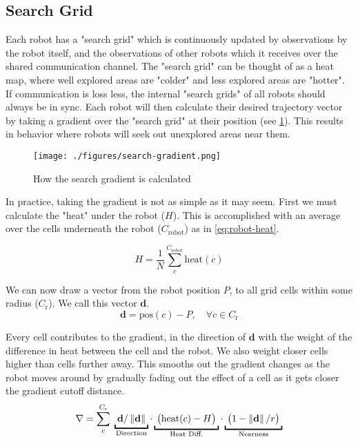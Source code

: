 
\subsection{Search Grid}

Each robot has a "search grid" which is continuously updated by observations by the robot itself, and the observations of other robots which it receives over the shared communication channel. The "search grid" can be thought of as a heat map, where well explored areas are "colder" and less explored areas are "hotter". If communication is loss less, the internal "search grids" of all robots should always be in sync. Each robot will then calculate their desired trajectory vector by taking a gradient over the "search grid" at their position (see \cref{fig:search-gradient}). This results in behavior where robots will seek out unexplored areas near them.

\begin{figure}[h]
    \begin{center}
        \texttt{[image: ./figures/search-gradient.png]}
    \end{center}
    \caption{How the search gradient is calculated}
    \label{fig:search-gradient}
\end{figure}


In practice, taking the gradient is not as simple as it may seem. First we must calculate the "heat" under the robot ($H$). This is accomplished with an average over the cells underneath the robot ($C_\mathrm{robot}$) as in \cref{eq:robot-heat}.

\begin{equation}
\label{eq:robot-heat}
    H = \frac{1}{N} \sum_c^{C_\mathrm{robot}} \mathrm{heat}(c)
\end{equation}

We can now draw a vector from the robot position $P$, to all grid cells within some radius ($C_\mathrm{r}$). We call this vector $\mathbf{d}$.
\begin{equation}
    \mathbf{d} = \mathrm{pos}(c) - P, \quad \forall c \in C_\mathrm{r}
\end{equation}

Every cell contributes to the gradient, in the direction of $\mathbf{d}$ with the weight of the difference in heat between the cell and the robot. We also weight closer cells higher than cells further away. This smooths out the gradient changes as the robot moves around by gradually fading out the effect of a cell as it gets closer the gradient cutoff distance.
\begin{equation}
    \nabla = \sum_c^{C_\mathrm{r}} \;
    \underbracket{\; \mathbf{d}/\norm{\mathbf{d}}      \;}_\text{\makebox[0pt]{Direction}} \cdot
    \underbracket{\; \big(\mathrm{heat}(c) - H\big)    \;}_\text{Heat Diff.} \cdot
    \underbracket{\; \big(1 - \norm{\mathbf{d}}/r\big) \;}_\text{Nearness}
\end{equation}

